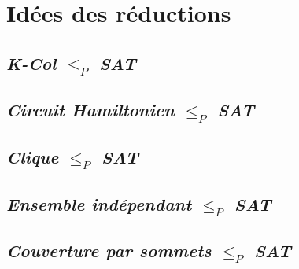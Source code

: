  \section{Idées des réductions}

  \subsection{\emph{K-Col} $\leq_P$ \emph{SAT}}

  \subsection{\emph{Circuit Hamiltonien} $\leq_P$ \emph{SAT}}

  \subsection{\emph{Clique} $\leq_P$ \emph{SAT}}

  \subsection{\emph{Ensemble indépendant} $\leq_P$ \emph{SAT}}

  \subsection{\emph{Couverture par sommets} $\leq_P$ \emph{SAT}}

